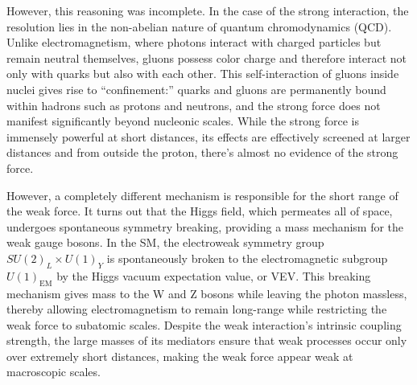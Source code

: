 However, this reasoning was incomplete. In the case of the strong interaction, the resolution lies in the non-abelian nature of quantum chromodynamics (QCD). Unlike electromagnetism, where photons interact with charged particles but remain neutral themselves, gluons possess color charge and therefore interact not only with quarks but also with each other. This self-interaction of gluons inside nuclei gives rise to ``confinement:'' quarks and gluons are permanently bound within hadrons such as protons and neutrons, and the strong force does not manifest significantly beyond nucleonic scales. While the strong force is immensely powerful at short distances, its effects are effectively screened at larger distances and from outside the proton, there’s almost no evidence of the strong force.

However, a completely different mechanism is responsible for the short range of the weak force. It turns out that the Higgs field, which permeates all of space, undergoes spontaneous symmetry breaking, providing a mass mechanism for the weak gauge bosons. In the SM, the electroweak symmetry group $SU(2)_L \times U(1)_Y$ is spontaneously broken to the electromagnetic subgroup $U(1)_{\text{EM}}$ by the Higgs vacuum expectation value, or VEV. This breaking mechanism gives mass to the W and Z bosons while leaving the photon massless, thereby allowing electromagnetism to remain long-range while restricting the weak force to subatomic scales. Despite the weak interaction's intrinsic coupling strength, the large masses of its mediators ensure that weak processes occur only over extremely short distances, making the weak force appear weak at macroscopic scales.





